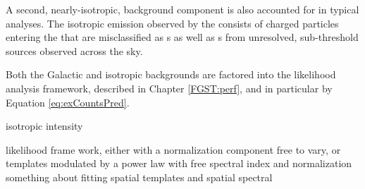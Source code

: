 A second, nearly-isotropic, background component is also accounted for in typical \lat{} analyses. The isotropic emission observed by the \lat{} consists of charged particles entering the \lat{} that are misclassified as \gam{}s as well as \gam{}s from unresolved, sub-threshold sources observed across the sky.

Both the Galactic and isotropic backgrounds are factored into the likelihood analysis framework, described in Chapter \ref{FGST:perf}, and in particular by Equation \ref{eq:exCountsPred}. 


isotropic intensity

likelihood frame work, either with a normalization component free to vary, or templates modulated by a power law with free spectral index and normalization
something about fitting spatial templates and spatial spectral

